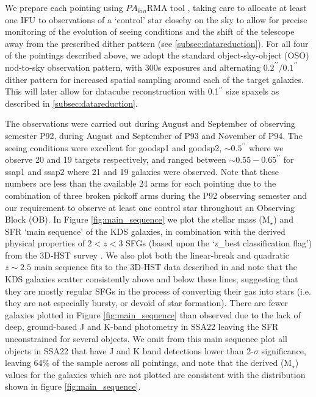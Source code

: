 \documentclass[fleqn,usenatbib]{mn2e}
\begin{document}
We prepare each pointing using $PA_{kin}$RMA tool \citep{Wegner2008}, taking care to allocate at least one IFU to observations of a `control' star closeby on the sky to allow for precise monitoring of the evolution of seeing conditions and the shift of the telescope away from the prescribed dither pattern (see \cref{subsec:datareduction}).
For all four of the pointings described above, we adopt the standard object-sky-object (OSO) nod-to-sky observation pattern, with 300s exposures and alternating $0.2^{\prime\prime}$/$0.1^{\prime\prime}$ dither pattern for increased spatial sampling around each of the target galaxies.
This will later allow for datacube reconstruction with 0.1$^{\prime\prime}$ size spaxels as described in \cref{subsec:datareduction}.

The observations were carried out during August and September of observing semester P92, during August and September of P93 and November of P94.
The seeing conditions were excellent for goodsp1 and goodsp2, $\sim 0.5^{\prime\prime}$ where we observe 20 and 19 targets respectively, and ranged between $\sim 0.55-0.65^{\prime\prime}$ for ssap1 and ssap2 where 21 and 19 galaxies were observed.
Note that these numbers are less than the available 24 arms for each pointing due to the combination of three broken pickoff arms during the P92 observing semester and our requirement to observe at least one control star throughout an Observing Block (OB).
In Figure \ref{fig:main_sequence} we plot the stellar mass (M$_{\star}$) and SFR `main sequence' of the KDS galaxies, in combination with the derived physical properties of $2 < z < 3$ SFGs (based upon the `z\_best classification flag') from the 3D-HST survey \citep{Brammer2012,Momcheva2015}.
We also plot both the linear-break and quadratic $z\sim 2.5$ main sequence fits to the 3D-HST data described in \cite{Whitaker2014} and note that the KDS galaxies scatter consistently above and below these lines, suggesting that they are mostly regular SFGs in the process of converting their gas into stars (i.e. they are not especially bursty, or devoid of star formation).
There are fewer galaxies plotted in Figure \ref{fig:main_sequence} than observed due to the lack of deep, ground-based J and K-band photometry in SSA22 leaving the SFR unconstrained for several objects.
We omit from this main sequence plot all objects in SSA22 that have J and K band detections lower than 2-$\sigma$ significance, leaving 64\% of the sample across all pointings, and note that the derived (M$_{\star}$) values for the galaxies which are not plotted are consistent with the distribution shown in figure \ref{fig:main_sequence}.
\end{document}
